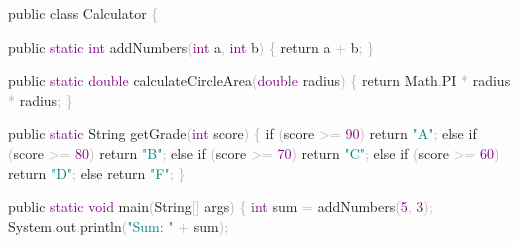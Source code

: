\documentclass[
  justified,
  openright,
]{tufte-book}
\newcommand{\BuiltInTok}[1]{#1}
\newcommand{\ControlFlowTok}[1]{\textcolor{BrandBlue}{#1}}
\newcommand{\DataTypeTok}[1]{\textcolor{Purple}{#1}}
\newcommand{\DecValTok}[1]{\textcolor{Purple}{#1}}
\newcommand{\FunctionTok}[1]{\textcolor{BrandBlue}{#1}}
\newcommand{\KeywordTok}[1]{\textcolor{BrandBlue}{#1}}
\newcommand{\NormalTok}[1]{#1}
\newcommand{\OperatorTok}[1]{\textcolor{DarkGray}{#1}}
\newcommand{\StringTok}[1]{\textcolor{Teal}{#1}}
\newenvironment{Shaded}{%
  \begin{snugshade}
}{%
  \end{snugshade}
}
\begin{document}
\begin{Shaded}
\begin{Highlighting}[]
\KeywordTok{public} \KeywordTok{class}\NormalTok{ Calculator }\OperatorTok{\{}

    \KeywordTok{public} \DataTypeTok{static} \DataTypeTok{int} \FunctionTok{addNumbers}\OperatorTok{(}\DataTypeTok{int}\NormalTok{ a}\OperatorTok{,} \DataTypeTok{int}\NormalTok{ b}\OperatorTok{)} \OperatorTok{\{}
        \ControlFlowTok{return}\NormalTok{ a }\OperatorTok{+}\NormalTok{ b}\OperatorTok{;}
    \OperatorTok{\}}

    \KeywordTok{public} \DataTypeTok{static} \DataTypeTok{double} \FunctionTok{calculateCircleArea}\OperatorTok{(}\DataTypeTok{double}\NormalTok{ radius}\OperatorTok{)} \OperatorTok{\{}
        \ControlFlowTok{return} \BuiltInTok{Math}\OperatorTok{.}\FunctionTok{PI} \OperatorTok{*}\NormalTok{ radius }\OperatorTok{*}\NormalTok{ radius}\OperatorTok{;}
    \OperatorTok{\}}

    \KeywordTok{public} \DataTypeTok{static} \BuiltInTok{String} \FunctionTok{getGrade}\OperatorTok{(}\DataTypeTok{int}\NormalTok{ score}\OperatorTok{)} \OperatorTok{\{}
        \ControlFlowTok{if} \OperatorTok{(}\NormalTok{score }\OperatorTok{\textgreater{}=} \DecValTok{90}\OperatorTok{)} \ControlFlowTok{return} \StringTok{"A"}\OperatorTok{;}
        \ControlFlowTok{else} \ControlFlowTok{if} \OperatorTok{(}\NormalTok{score }\OperatorTok{\textgreater{}=} \DecValTok{80}\OperatorTok{)} \ControlFlowTok{return} \StringTok{"B"}\OperatorTok{;}
        \ControlFlowTok{else} \ControlFlowTok{if} \OperatorTok{(}\NormalTok{score }\OperatorTok{\textgreater{}=} \DecValTok{70}\OperatorTok{)} \ControlFlowTok{return} \StringTok{"C"}\OperatorTok{;}
        \ControlFlowTok{else} \ControlFlowTok{if} \OperatorTok{(}\NormalTok{score }\OperatorTok{\textgreater{}=} \DecValTok{60}\OperatorTok{)} \ControlFlowTok{return} \StringTok{"D"}\OperatorTok{;}
        \ControlFlowTok{else} \ControlFlowTok{return} \StringTok{"F"}\OperatorTok{;}
    \OperatorTok{\}}

    \KeywordTok{public} \DataTypeTok{static} \DataTypeTok{void} \FunctionTok{main}\OperatorTok{(}\BuiltInTok{String}\OperatorTok{[]}\NormalTok{ args}\OperatorTok{)} \OperatorTok{\{}
        \DataTypeTok{int}\NormalTok{ sum }\OperatorTok{=} \FunctionTok{addNumbers}\OperatorTok{(}\DecValTok{5}\OperatorTok{,} \DecValTok{3}\OperatorTok{);}
        \BuiltInTok{System}\OperatorTok{.}\FunctionTok{out}\OperatorTok{.}\FunctionTok{println}\OperatorTok{(}\StringTok{"Sum: "} \OperatorTok{+}\NormalTok{ sum}\OperatorTok{);}


\end{Highlighting}
\end{Shaded}
\end{document}
